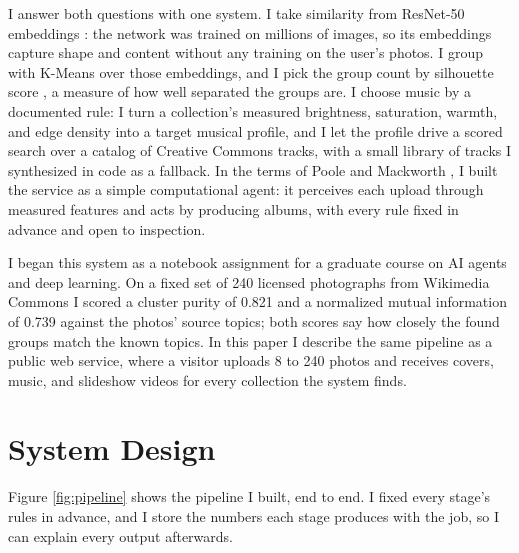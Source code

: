 \documentclass[conference]{IEEEtran}
\begin{document}
I answer both questions with one system. I take similarity from
ResNet-50 embeddings \cite{he2016}: the network was trained on
millions of images, so its embeddings capture shape and content
without any training on the user's photos. I group with K-Means
over those embeddings, and I pick the group count by silhouette
score \cite{rousseeuw1987}, a measure of how well separated the
groups are. I choose music by a documented rule: I turn a
collection's measured brightness, saturation, warmth, and edge
density into a target musical profile, and I let the profile drive
a scored search over a catalog of Creative Commons tracks, with a
small library of tracks I synthesized in code as a fallback. In
the terms of Poole and Mackworth \cite{poole2017}, I built the
service as a simple computational agent: it perceives each upload
through measured features and acts by producing albums, with every
rule fixed in advance and open to inspection.

I began this system as a notebook assignment for a graduate course
on AI agents and deep learning. On a fixed set of 240 licensed
photographs from Wikimedia Commons I scored a cluster purity of
0.821 and a normalized mutual information of 0.739 against the
photos' source topics; both scores say how closely the found
groups match the known topics. In this paper I describe the same
pipeline as a public web service, where a visitor uploads 8 to 240
photos and receives covers, music, and slideshow videos for every
collection the system finds.

\section{System Design}

Figure \ref{fig:pipeline} shows the pipeline I built, end to end.
I fixed every stage's rules in advance, and I store the numbers
each stage produces with the job, so I can explain every output
afterwards.
\end{document}

